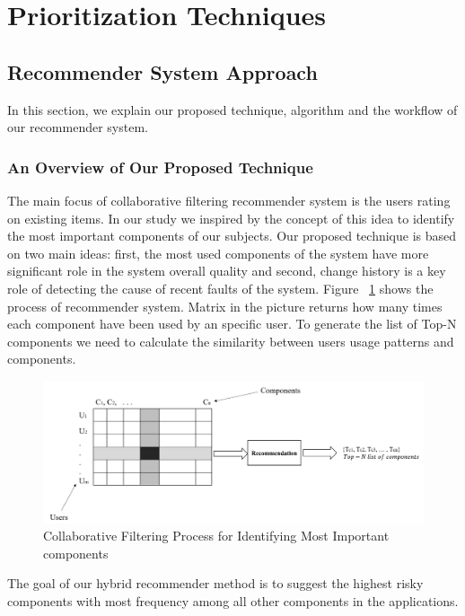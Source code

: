 \vspace*{4pt}

\section{Prioritization Techniques}

\subsection{ Recommender System Approach}
\label{sec:approach}
In this section, we explain our proposed technique, algorithm and the 
workflow of our recommender system. 

\subsubsection{An Overview of Our Proposed Technique }
The main focus of collaborative filtering recommender system is 
the users rating on existing items. In our study we inspired by the concept of 
this idea to identify the most important components of our subjects.
Our proposed technique is based on two main ideas: first,
the most used components of the system have more significant role
in the system overall quality and second, change history is a key
role of detecting the cause of recent faults of the system. 
Figure ~\ref{fig:collabrotaivefiltering} shows the process of recommender system. 
Matrix in the picture returns how many times each component have been used by 
an specific user. To generate the list of Top-N components we need to calculate
the similarity between users usage patterns and components.\\
\begin{figure}[!ht]
	\centering
	\includegraphics[width=0.75\linewidth]{./collaborative-filtring.png}
	\vspace*{-3pt}
	\caption{Collaborative Filtering Process for Identifying Most Important components}
	\label{fig:collabrotaivefiltering}
\end{figure} 
The goal of our hybrid recommender method is to suggest the highest risky 
components with most frequency among all other components in the applications. 
